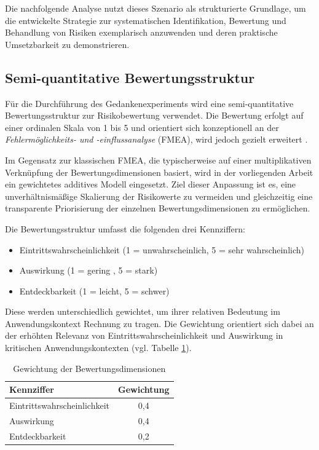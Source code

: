 Die nachfolgende Analyse nutzt dieses Szenario als strukturierte Grundlage, 
um die entwickelte Strategie zur systematischen Identifikation, 
Bewertung und Behandlung von Risiken exemplarisch anzuwenden und deren praktische Umsetzbarkeit zu demonstrieren.

\subsection{Semi-quantitative Bewertungsstruktur}

Für die Durchführung des Gedankenexperiments wird eine semi-quantitative Bewertungsstruktur 
zur Risikobewertung verwendet. Die Bewertung erfolgt auf einer ordinalen 
Skala von 1 bis 5 und orientiert sich konzeptionell an der \textit{Fehlermöglichkeits- und -einflussanalyse} (FMEA), 
wird jedoch gezielt erweitert \citep{Bundesministerium_2018}.

Im Gegensatz zur klassischen FMEA, die typischerweise auf einer multiplikativen 
Verknüpfung der Bewertungsdimensionen basiert, 
wird in der vorliegenden Arbeit ein gewichtetes additives Modell eingesetzt. 
Ziel dieser Anpassung ist es, eine unverhältnismäßige Skalierung der Risikowerte 
zu vermeiden und gleichzeitig eine transparente Priorisierung der einzelnen Bewertungsdimensionen zu ermöglichen.

Die Bewertungsstruktur umfasst die folgenden drei Kennziffern:
\begin{itemize}
    \item Eintrittswahrscheinlichkeit (1 = unwahrscheinlich, 5 = sehr wahrscheinlich)
    \item Auswirkung (1 = gering , 5 = stark)
    \item Entdeckbarkeit (1 = leicht, 5 = schwer)
\end{itemize}

Diese werden unterschiedlich gewichtet, um ihrer relativen Bedeutung im Anwendungskontext Rechnung zu tragen. 
Die Gewichtung orientiert sich dabei an der erhöhten Relevanz von 
Eintrittswahrscheinlichkeit und Auswirkung in kritischen Anwendungskontexten
(vgl. Tabelle \hyperref[tab:gewichtung]{\ref{tab:gewichtung}}).

\begin{table}[H]
    \centering
    \label{tab:gewichtung}
    \begin{tabular}{l c}
    \hline
    \textbf{Kennziffer} & \textbf{Gewichtung} \\
    \hline
    Eintrittswahrscheinlichkeit & 0{,}4 \\
    Auswirkung                  & 0{,}4 \\
    Entdeckbarkeit              & 0{,}2 \\
    \hline
    \end{tabular}
    \caption{Gewichtung der Bewertungsdimensionen}
\end{table}

